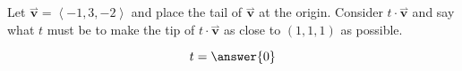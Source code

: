 \documentclass{ximera}
\author{Bart Snapp}
\begin{document}
\begin{exercise}
Let $\overset{\boldsymbol{\rightharpoonup}}{\mathbf{v}} = \left< -1,3,-2 \right>$ and place the tail of $\overset{\boldsymbol{\rightharpoonup}}{\mathbf{v}}$ at the
  origin. Consider $t\cdot \overset{\boldsymbol{\rightharpoonup}}{\mathbf{v}}$ and say what $t$ must be to make
  the tip of $t\cdot \overset{\boldsymbol{\rightharpoonup}}{\mathbf{v}}$ as close to $(1,1,1)$ as possible.
  \begin{prompt}
    \[
    t=\answer{0}
    \]
  \end{prompt}
\end{exercise}
\end{document}
